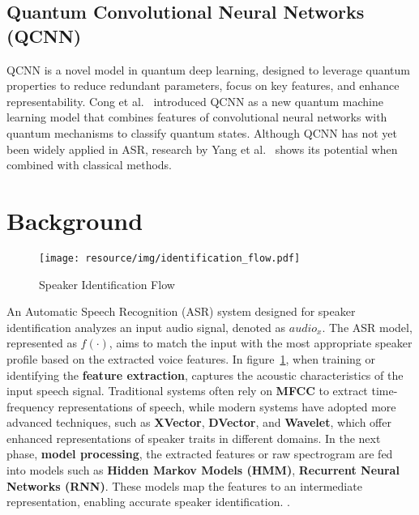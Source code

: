 \documentclass[conference]{IEEEtran}
\begin{document}
\subsection{Quantum Convolutional Neural Networks (QCNN)}

QCNN is a novel model in quantum deep learning, designed to leverage quantum properties to reduce redundant parameters, focus on key features, and enhance representability. Cong et al.~\cite{Cong2019QuantumCNN} introduced QCNN as a new quantum machine learning model that combines features of convolutional neural networks with quantum mechanisms to classify quantum states. Although QCNN has not yet been widely applied in ASR, research by Yang et al.~\cite{Yang2021Decentralizing} shows its potential when combined with classical methods.

\section{Background}


\begin{figure}[H]
    \centering
    \begin{minipage}{0.5\textwidth}
        \centering
        \texttt{[image: resource/img/identification\_flow.pdf]}
        \caption{Speaker Identification Flow}
        \label{fig:identification_flow}
    \end{minipage}

\end{figure}


An Automatic Speech Recognition (ASR) system designed for speaker identification analyzes an input audio signal, denoted as $audio_x$.
The ASR model, represented as $f(\cdot)$, aims to match the input with the most appropriate speaker profile based on the extracted voice features.
In figure~\ref{fig:identification_flow}, when training or identifying the \textbf{feature extraction},
captures the acoustic characteristics of the input speech signal. Traditional systems often rely on \textbf{MFCC} to extract time-frequency representations of speech,
while modern systems have adopted more advanced techniques, such as \textbf{XVector}, \textbf{DVector}, and \textbf{Wavelet}, which offer enhanced representations of
speaker traits in different domains. In the next phase, \textbf{model processing}, the extracted features or raw spectrogram are fed into models such as \textbf{Hidden Markov Models (HMM)},
\textbf{Recurrent Neural Networks (RNN)}. These models map the features to an intermediate representation,
enabling accurate speaker identification. \cite{davis1980comparison, Snyder2018Xvectors,wan2018dvector,graves2013speech}.
\end{document}
